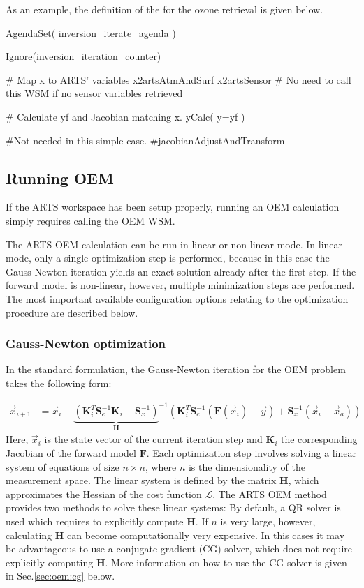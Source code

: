 As an example, the definition of the 
for the ozone retrieval is given below.

\begin{code}
AgendaSet( inversion_iterate_agenda ){

  Ignore(inversion_iteration_counter)
    
  # Map x to ARTS' variables
  x2artsAtmAndSurf
  x2artsSensor   # No need to call this WSM if no sensor variables retrieved

  # Calculate yf and Jacobian matching x.
  yCalc( y=yf )

  #Not needed in this simple case.
  #jacobianAdjustAndTransform
}
\end{code}

\subsection{Running OEM}

If the ARTS workspace has been setup properly, running an OEM calculation
simply requires calling the OEM WSM. 

The ARTS OEM calculation can be run in linear or non-linear mode. In linear
mode, only a single optimization step is performed, because in this case 
the Gauss-Newton iteration yields an exact solution already after the
first step. If the forward model is non-linear, however,
 multiple minimization steps are performed. The most important available
configuration options relating to the optimization procedure are described
below.

\subsubsection{Gauss-Newton optimization}
\label{ref:oem:gn}

In the standard formulation, the Gauss-Newton iteration for the OEM problem
takes the following form:

\begin{eqnarray}\label{eq:oem:gn}
\vec{x}_{i + 1} &= \vec{x}_i - 
{\underbrace{ (
  \mathbf{K}_i^T \mathbf{S}_e^{-1} \mathbf{K}_i + \mathbf{S}^{-1}_x
)} _{ \mathbf{H}}} ^{-1}
(\mathbf{K}_i^T\mathbf{S}^{-1}_e (\mathbf{F}(\vec{x}_i) - \vec{y}) + \mathbf{S}_x^{-1}(\vec{x}_i - \vec{x}_a) )
 \end{eqnarray}
Here, $\vec{x}_i$ is the state vector of the current iteration step
and $\mathbf{K}_i$ the corresponding Jacobian of the forward model $\mathbf{F}$.
Each optimization step involves solving a linear system of equations
 of size $n \times n$, where $n$ is the dimensionality of the measurement space.
The linear system is defined by the matrix $\mathbf{H}$, which approximates 
the Hessian of the cost function $\mathcal{L}$. The ARTS OEM method provides two methods
to solve these linear systems: By default, a QR solver is used which requires to
explicitly compute $\mathbf{H}$. If $n$ is very large, however, calculating
 $\mathbf{H}$ can become computationally very expensive. In this cases it may be
 advantageous to use a conjugate gradient (CG) solver, which does not require explicitly
computing $\mathbf{H}$. More information on how to use the CG solver is given in
 Sec.\ref{sec:oem:cg} below.

